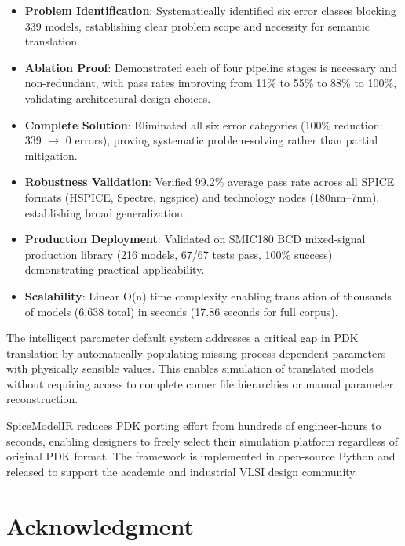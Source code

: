 \documentclass[conference]{IEEEtran}
\begin{document}
\begin{itemize}
\item \textbf{Problem Identification}: Systematically identified six error classes blocking 339 models, establishing clear problem scope and necessity for semantic translation.

\item \textbf{Ablation Proof}: Demonstrated each of four pipeline stages is necessary and non-redundant, with pass rates improving from 11\% to 55\% to 88\% to 100\%, validating architectural design choices.

\item \textbf{Complete Solution}: Eliminated all six error categories (100\% reduction: 339 $\rightarrow$ 0 errors), proving systematic problem-solving rather than partial mitigation.

\item \textbf{Robustness Validation}: Verified 99.2\% average pass rate across all SPICE formats (HSPICE, Spectre, ngspice) and technology nodes (180nm--7nm), establishing broad generalization.

\item \textbf{Production Deployment}: Validated on SMIC180 BCD mixed-signal production library (216 models, 67/67 tests pass, 100\% success) demonstrating practical applicability.

\item \textbf{Scalability}: Linear O(n) time complexity enabling translation of thousands of models (6,638 total) in seconds (17.86 seconds for full corpus).
\end{itemize}

The intelligent parameter default system addresses a critical gap in PDK translation by automatically populating missing process-dependent parameters with physically sensible values. This enables simulation of translated models without requiring access to complete corner file hierarchies or manual parameter reconstruction.

SpiceModelIR reduces PDK porting effort from hundreds of engineer-hours to seconds, enabling designers to freely select their simulation platform regardless of original PDK format. The framework is implemented in open-source Python and released to support the academic and industrial VLSI design community.

\section*{Acknowledgment}
\end{document}
